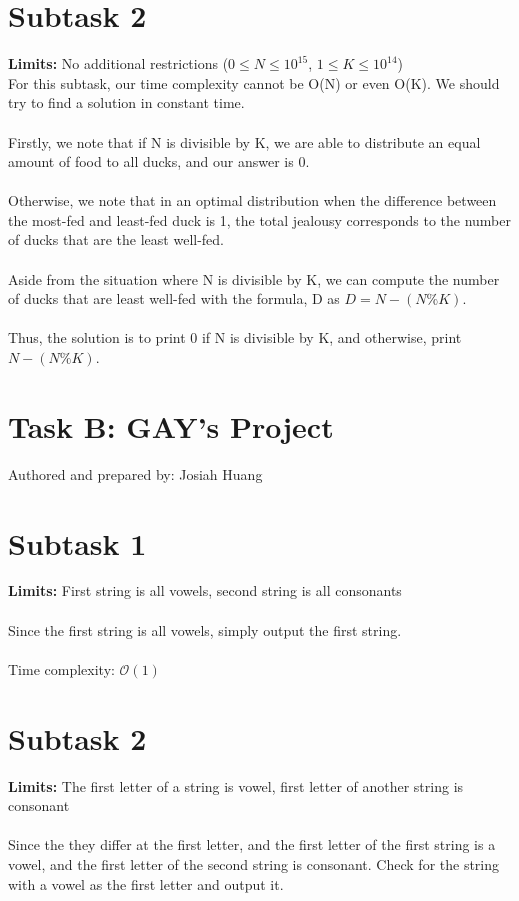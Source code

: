 \documentclass{report}
\begin{document}
\section*{Subtask 2}
\textbf{Limits: } No additional restrictions (\(0 \leq N \leq 10^{15}\), \(1 \leq K \leq 10^{14}\))\\
For this subtask, our time complexity cannot be O(N) or even O(K). We should try to find a solution in constant time.\\\\
Firstly, we note that if N is divisible by K, we are able to distribute an equal amount of food to all ducks, and our answer is 0.\\\\
Otherwise, we note that in an optimal distribution when the difference between the most-fed and least-fed duck is 1, the total jealousy corresponds to the number of ducks that are the least well-fed.\\\\
Aside from the situation where N is divisible by K, we can compute the number of ducks that are least well-fed with the formula, D as $D = N-(N\%K)$.\\\\
Thus, the solution is to print 0 if N is divisible by K, and otherwise, print $N-(N\%K)$.
\pagebreak

\section*{Task B: GAY's Project}
Authored and prepared by: Josiah Huang

\section*{Subtask 1}
\textbf{Limits: } First string is all vowels, second string is all consonants\\\\
Since the first string is all vowels, simply output the first string.\\\\

Time complexity: $\mathcal{O}(1)$

\section*{Subtask 2}
\textbf{Limits: } The first letter of a string is vowel, first letter of another string is consonant
\\\\
Since the they differ at the first letter, and the first letter of the first string is a vowel, and the first letter of the second string is consonant. Check for the string with a vowel as the first letter and output it.\\\\
\end{document}
